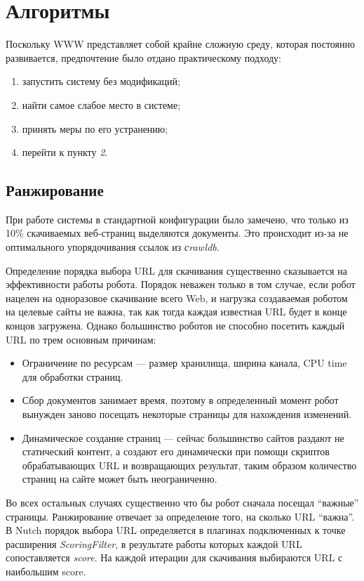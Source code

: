 \chapter{Алгоритмы}
Поскольку WWW представляет собой крайне сложную среду, которая постоянно развивается, предпочтение было отдано практическому подходу:
\begin{enumerate}
 \item запустить систему без модификаций;
 \item найти самое слабое место в системе;
 \item принять меры по его устранению;
 \item перейти к пункту \textit{2}.
\end{enumerate}
\section{Ранжирование}
При работе системы в стандартной конфигурации было замечено, что только из 10\% скачиваемых веб-страниц выделяются документы. Это происходит из-за не оптимального упорядочивания ссылок из \textit{сrawldb}.

Определение порядка выбора URL для скачивания существенно сказывается на эффективности работы робота.\cite{crawl}\cite{focused}\cite{opic} Порядок неважен только в том случае, если робот нацелен на одноразовое скачивание всего Web, и нагрузка создаваемая роботом на целевые сайты не важна, так как тогда каждая известная URL будет в конце концов загружена. Однако большинство роботов не способно посетить каждый URL по трем основным причинам:
\begin{itemize}
 \item Ограничение по ресурсам --- размер хранилища, ширина канала, CPU time для обработки страниц.
 \item Сбор документов занимает время, поэтому в определенный момент робот вынужден заново посещать некоторые страницы для нахождения изменений.
 \item Динамическое создание страниц --- сейчас большинство сайтов раздают не статический контент, а создают его динамически при помощи скриптов обрабатывающих URL и возвращающих результат, таким образом количество страниц на сайте может быть неограниченно.
\end{itemize}

Во всех остальных случаях существенно что бы робот сначала посещал ``важные'' страницы. Ранжирование отвечает за определение того, на сколько URL ``важна''.
В Nutch порядок выбора URL определяется в плагинах подключенных к точке расширения \textit{ScoringFilter}, в результате работы которых каждой URL сопоставляется \textit{score}. На каждой итерации для скачивания выбираются URL с наибольшим score.

